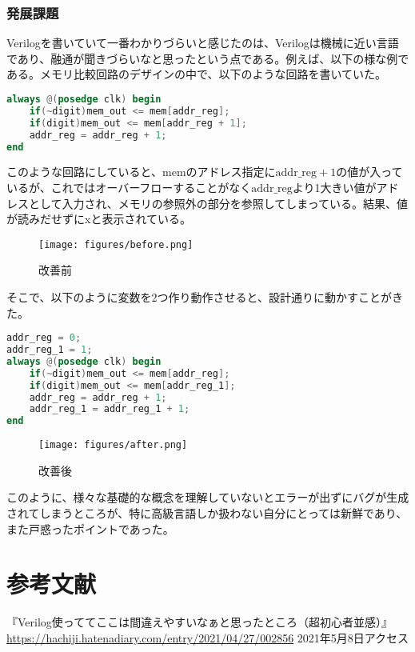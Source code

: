 \documentclass[titlepage]{ltjsarticle}
\begin{document}
\subsubsection{発展課題}
Verilogを書いていて一番わかりづらいと感じたのは、Verilogは機械に近い言語であり、融通が聞きづらいなと思ったという点である。例えば、以下の様な例である。メモリ比較回路のデザインの中で、以下のような回路を書いていた。
\begin{lstlisting}[caption=読み出し回路(一部 修正前),language=verilog]
always @(posedge clk) begin
    if(~digit)mem_out <= mem[addr_reg];
    if(digit)mem_out <= mem[addr_reg + 1];
    addr_reg = addr_reg + 1;
end
\end{lstlisting}
このような回路にしていると、memのアドレス指定に$\mbox{addr}\_\mbox{reg}+1$の値が入っているが、これではオーバーフローすることがなく$\mbox{addr}\_\mbox{reg}$より1大きい値がアドレスとして入力され、メモリの参照外の部分を参照してしまっている。結果、値が読みだせずにxと表示されている。
\begin{figure}[H]
    \begin{center}
        \texttt{[image: figures/before.png]}
        \caption{改善前}
    \end{center}
\end{figure}
そこで、以下のように変数を2つ作り動作させると、設計通りに動かすことがきた。
\begin{lstlisting}[caption=読み出し回路(一部 修正後),language=verilog]
addr_reg = 0;
addr_reg_1 = 1;
always @(posedge clk) begin
    if(~digit)mem_out <= mem[addr_reg];
    if(digit)mem_out <= mem[addr_reg_1];
    addr_reg = addr_reg + 1;
    addr_reg_1 = addr_reg_1 + 1;
end
\end{lstlisting}
\begin{figure}[H]
    \begin{center}
        \texttt{[image: figures/after.png]}
        \caption{改善後}
    \end{center}
\end{figure}
このように、様々な基礎的な概念を理解していないとエラーが出ずにバグが生成されてしまうところが、特に高級言語しか扱わない自分にとっては新鮮であり、また戸惑ったポイントであった。
\section{参考文献}
『Verilog使っててここは間違えやすいなぁと思ったところ（超初心者並感）』\url{https://hachiji.hatenadiary.com/entry/2021/04/27/002856} 2021年5月8日アクセス
\end{document}
